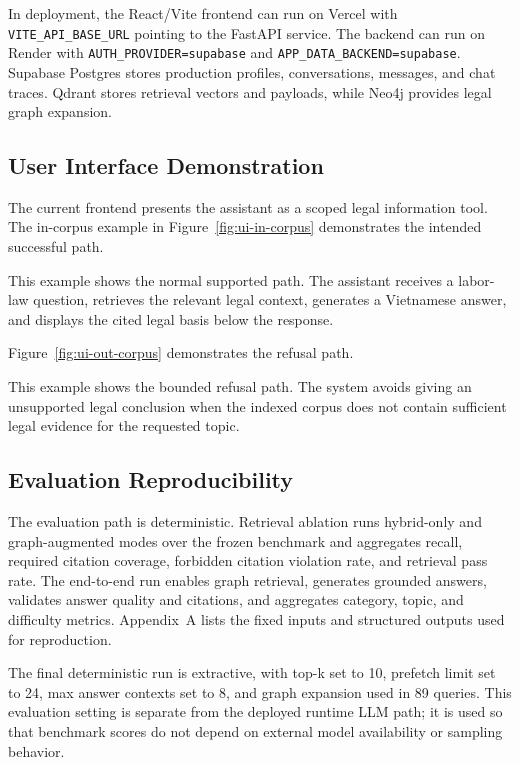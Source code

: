 In deployment, the React/Vite frontend can run on Vercel with \texttt{VITE\_API\_BASE\_URL} pointing to the FastAPI service. The backend can run on Render with \texttt{AUTH\_PROVIDER=supabase} and \texttt{APP\_DATA\_BACKEND=supabase}. Supabase Postgres stores production profiles, conversations, messages, and chat traces. Qdrant stores retrieval vectors and payloads, while Neo4j provides legal graph expansion.

\subsection{User Interface Demonstration}
The current frontend presents the assistant as a scoped legal information tool. The in-corpus example in Figure~\ref{fig:ui-in-corpus} demonstrates the intended successful path.


This example shows the normal supported path. The assistant receives a labor-law question, retrieves the relevant legal context, generates a Vietnamese answer, and displays the cited legal basis below the response.

Figure~\ref{fig:ui-out-corpus} demonstrates the refusal path.


This example shows the bounded refusal path. The system avoids giving an unsupported legal conclusion when the indexed corpus does not contain sufficient legal evidence for the requested topic.

\subsection{Evaluation Reproducibility}
The evaluation path is deterministic. Retrieval ablation runs hybrid-only and graph-augmented modes over the frozen benchmark and aggregates recall, required citation coverage, forbidden citation violation rate, and retrieval pass rate. The end-to-end run enables graph retrieval, generates grounded answers, validates answer quality and citations, and aggregates category, topic, and difficulty metrics. Appendix~A lists the fixed inputs and structured outputs used for reproduction.

The final deterministic run is extractive, with top-k set to 10, prefetch limit set to 24, max answer contexts set to 8, and graph expansion used in 89 queries. This evaluation setting is separate from the deployed runtime LLM path; it is used so that benchmark scores do not depend on external model availability or sampling behavior.

